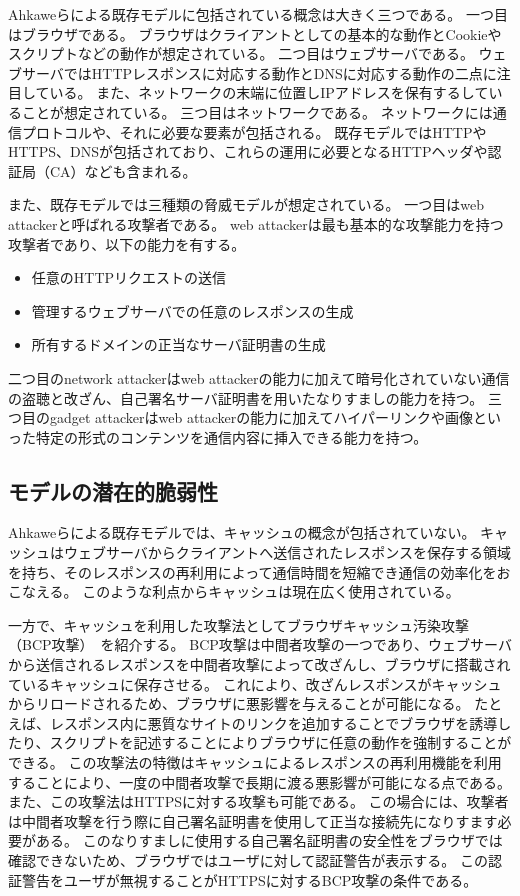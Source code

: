 \documentclass{css}
\begin{document}
Ahkaweらによる既存モデル\cite{webmodel}に包括されている概念は大きく三つである。
一つ目はブラウザである。
ブラウザはクライアントとしての基本的な動作とCookieやスクリプトなどの動作が想定されている。
二つ目はウェブサーバである。
ウェブサーバではHTTPレスポンスに対応する動作とDNSに対応する動作の二点に注目している。
また、ネットワークの末端に位置しIPアドレスを保有するしていることが想定されている。
三つ目はネットワークである。
ネットワークには通信プロトコルや、それに必要な要素が包括される。
既存モデルではHTTPやHTTPS、DNSが包括されており、これらの運用に必要となるHTTPヘッダや認証局（CA）なども含まれる。

また、既存モデルでは三種類の脅威モデルが想定されている。
一つ目はweb attackerと呼ばれる攻撃者である。
web attackerは最も基本的な攻撃能力を持つ攻撃者であり、以下の能力を有する。
\begin{itemize}
\item 任意のHTTPリクエストの送信
\item 管理するウェブサーバでの任意のレスポンスの生成
\item 所有するドメインの正当なサーバ証明書の生成
\end{itemize}
二つ目のnetwork attackerはweb attackerの能力に加えて暗号化されていない通信の盗聴と改ざん、自己署名サーバ証明書を用いたなりすましの能力を持つ。
三つ目のgadget attackerはweb attackerの能力に加えてハイパーリンクや画像といった特定の形式のコンテンツを通信内容に挿入できる能力を持つ。

\subsection{モデルの潜在的脆弱性}
\label{sec:problem}
Ahkaweらによる既存モデル\cite{webmodel}では、キャッシュの概念が包括されていない。
キャッシュはウェブサーバからクライアントへ送信されたレスポンスを保存する領域を持ち、そのレスポンスの再利用によって通信時間を短縮でき通信の効率化をおこなえる。
このような利点からキャッシュは現在広く使用されている。

一方で、キャッシュを利用した攻撃法としてブラウザキャッシュ汚染攻撃（BCP攻撃）~\cite{bcpattack}を紹介する。
BCP攻撃は中間者攻撃の一つであり、ウェブサーバから送信されるレスポンスを中間者攻撃によって改ざんし、ブラウザに搭載されているキャッシュに保存させる。
これにより、改ざんレスポンスがキャッシュからリロードされるため、ブラウザに悪影響を与えることが可能になる。
たとえば、レスポンス内に悪質なサイトのリンクを追加することでブラウザを誘導したり、スクリプトを記述することによりブラウザに任意の動作を強制することができる。
この攻撃法の特徴はキャッシュによるレスポンスの再利用機能を利用することにより、一度の中間者攻撃で長期に渡る悪影響が可能になる点である。
また、この攻撃法はHTTPSに対する攻撃も可能である。
この場合には、攻撃者は中間者攻撃を行う際に自己署名証明書を使用して正当な接続先になりすます必要がある。
このなりすましに使用する自己署名証明書の安全性をブラウザでは確認できないため、ブラウザではユーザに対して認証警告が表示する。
この認証警告をユーザが無視することがHTTPSに対するBCP攻撃の条件である。
\end{document}
